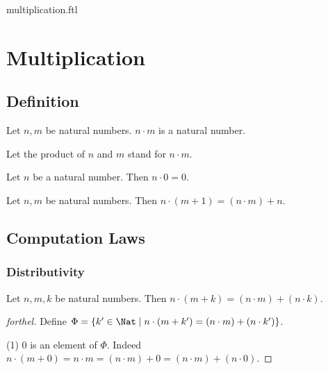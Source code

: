 \documentclass{naproche-library}
\begin{document}
\begin{smodule}{multiplication.ftl}

  \section*{Multiplication}

  \subsection*{Definition}

  \begin{signature}[forthel,id=ARITHMETIC_06_6626346484629504]
    Let $n, m$ be natural numbers.
    $n \cdot m$ is a natural number.

    Let the product of $n$ and $m$ stand for $n \cdot m$.
  \end{signature}

  \begin{axiom}[forthel,id=ARITHMETIC_06_8941041092657152]
    Let $n$ be a natural number.
    Then $n \cdot 0 = 0$.
  \end{axiom}

  \begin{axiom}[forthel,id=ARITHMETIC_06_2211275408932864]
    Let $n, m$ be natural numbers.
    Then $n \cdot (m + 1) = (n \cdot m) + n$.
  \end{axiom}


  \subsection*{Computation Laws}

  \subsubsection*{Distributivity}

  \begin{proposition}[forthel,id=ARITHMETIC_06_9001524774567936]
    Let $n, m, k$ be natural numbers.
    Then $n \cdot (m + k) = (n \cdot m) + (n \cdot k)$.
  \end{proposition}
  \begin{proof}[forthel]
    Define $\Phi = \{ k' \in \Nat \mid n \cdot (m + k') = (n \cdot m) + (n \cdot k') \}$.

    (1) $0$ is an element of $\Phi$.
    Indeed $n \cdot (m + 0)
      = n \cdot m
      = (n \cdot m) + 0
      = (n \cdot m) + (n \cdot 0)$.


\end{proof}
\end{smodule}
\end{document}
